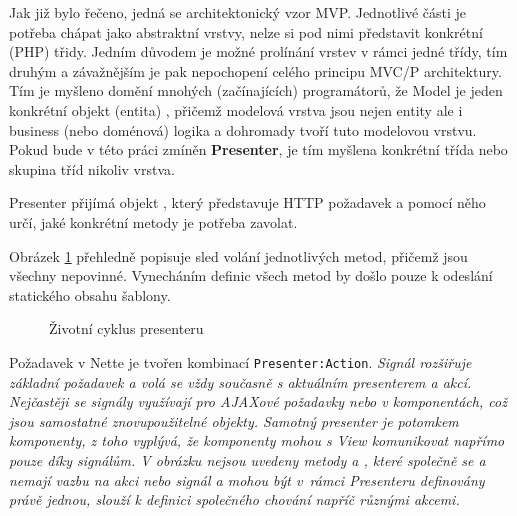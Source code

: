 Jak již bylo řečeno, jedná se architektonický vzor MVP. 
Jednotlivé části je potřeba chápat jako abstraktní vrstvy, nelze si pod nimi představit konkrétní (PHP) třidy.
Jedním důvodem je možné prolínání vrstev v rámci jedné třídy, tím druhým a závažnějším je pak nepochopení celého principu MVC/P architektury. Tím je myšleno domění mnohých (začínajících) programátorů, že Model je jeden konkrétní objekt (entita) , přičemž modelová vrstva jsou nejen entity ale i business (nebo doménová) logika a dohromady tvoří tuto modelovou vrstvu. Pokud bude v této práci zmíněn \textbf{Presenter}, je tím myšlena konkrétní třída nebo skupina tříd nikoliv vrstva.


Presenter přijímá objekt , který představuje HTTP požadavek a pomocí něho určí, jaké konkrétní metody je potřeba zavolat. 

Obrázek \ref{fig:zivotniCyklusPresenteru} přehledně popisuje sled volání jednotlivých metod, přičemž jsou všechny nepovinné. Vynecháním definic všech metod by došlo pouze k odeslání statického obsahu šablony.

\begin{figure}[h]
		\centering \tiny {}\selectfont
		\def\scgscale{1}
		
		\normalsize \sffamily
		\captionsetup{width=\linewidth}
		\caption{Životní cyklus presenteru}
		\label{fig:zivotniCyklusPresenteru}
\end{figure}

Požadavek v Nette je tvořen kombinací \texttt{Presenter:Action}. \it{Signál} rozšiřuje základní požadavek a volá se vždy současně s aktuálním presenterem a akcí. Nejčastěji se signály využívají pro AJAXové požadavky nebo v komponentách, což jsou samostatné znovupoužitelné objekty. Samotný presenter je potomkem komponenty, z toho vyplývá, že komponenty mohou s View komunikovat napřímo pouze díky signálům. V obrázku nejsou uvedeny metody  a , které společně se  a  nemají vazbu na \it{akci} nebo \it{signál} a mohou být v~rámci Presenteru definovány právě jednou, slouží k definici společného chování napříč různými akcemi.

